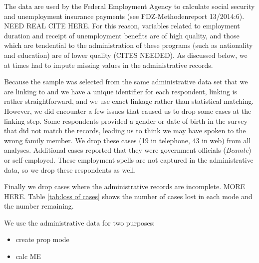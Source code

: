 The data are used by the Federal Employment Agency to calculate social security and unemployment insurance payments (see FDZ-Methodenreport 13/2014:6). NEED REAL CITE HERE. For this reason, variables related to employment duration and receipt of unemployment benefits are of high quality, and those which are tendential to the administration of these programs (such as nationality and education) are of lower quality (CITES NEEDED). As discussed below, we at times had to impute missing values in the administrative records. 

Because the sample was selected from the same administrative data set that we are linking to and we have a unique identifier for each respondent, linking is rather straightforward, and we use exact linkage rather than statistical matching. However, we did encounter a few issues that caused us to drop some cases at the linking step. Some respondents provided a gender or date of birth in the survey that did not match the records, leading us to think we may have spoken to the wrong family member. We drop these cases (19 in telephone, 43 in web) from all analyses. Additional cases reported that they were government officials (\textit{Beamte}) or self-employed. These employment spells are not captured in the administrative data, so we drop these respondents as well.

Finally we drop cases where the administrative records are incomplete. MORE HERE. Table \ref{tab:loss of cases} shows the number of cases lost in each mode and the number remaining. 



We use the administrative data for two purposes:
\begin{itemize}
\item create prop mode
\item calc ME
\end{itemize}



